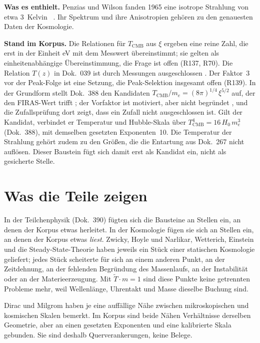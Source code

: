 \textbf{Was es enthielt.} Penzias und Wilson fanden 1965 eine isotrope Strahlung von etwa
$3$~Kelvin \QM~\cite{PenziasWilson1965}. Ihr Spektrum und ihre Anisotropien gehören zu den
genauesten Daten der Kosmologie.

\textbf{Stand im Korpus.} Die Relationen für $T_{\mathrm{CMB}}$ aus $\xi$ ergeben eine reine Zahl,
die erst in der Einheit eV mit dem Messwert übereinstimmt; sie gelten als einheitenabhängige
Übereinstimmung, die Frage ist offen (R137, R70). Die Relation $T(z)$ in Dok.~039 ist durch
Messungen ausgeschlossen \XM. Der Faktor~3 vor der Peak-Folge ist eine Setzung, die
Peak-Selektion insgesamt offen (R139). In der Grundform stellt Dok.~388 den Kandidaten
$T_{\mathrm{CMB}}/m_e=(8\pi)^{1/4}\,\xi^{5/2}$ auf, der den FIRAS-Wert trifft \KM; der Vorfaktor
ist motiviert, aber nicht begründet \SM, und die Zufallsprüfung dort zeigt, dass ein Zufall nicht
ausgeschlossen ist. Gilt der Kandidat, verbindet er Temperatur und Hubble-Skala über
$T_{\mathrm{CMB}}^4=16\,H_0\,m_e^3$ \BM{} (Dok.~388), mit demselben gesetzten Exponenten~10.
Die Temperatur der Strahlung gehört zudem zu den Größen, die die Entartung aus Dok.~267 nicht
auflösen. Dieser Baustein fügt sich damit erst als Kandidat ein, nicht als gesicherte Stelle.

\section{Was die Teile zeigen}

In der Teilchenphysik (Dok.~390) fügten sich die Bausteine an Stellen ein, an denen der Korpus
etwas herleitet. In der Kosmologie fügen sie sich an Stellen ein, an denen der Korpus etwas
\emph{liest}. Zwicky, Hoyle und Narlikar, Wetterich, Einstein und die Steady-State-Theorie haben
jeweils ein Stück einer statischen Kosmologie geliefert; jedes Stück scheiterte für sich an einem
anderen Punkt, an der Zeitdehnung, an der fehlenden Begründung des Massenlaufs, an der Instabilität
oder an der Materieerzeugung. Mit $\tilde T\cdot m=1$ sind diese Punkte keine getrennten Probleme
mehr, weil Wellenlänge, Uhrentakt und Masse dieselbe Buchung sind.

Dirac und Milgrom haben je eine auffällige Nähe zwischen mikroskopischen und kosmischen Skalen
bemerkt. Im Korpus sind beide Nähen Verhältnisse derselben Geometrie, aber an einen gesetzten
Exponenten und eine kalibrierte Skala gebunden. Sie sind deshalb Querverankerungen, keine Belege.

